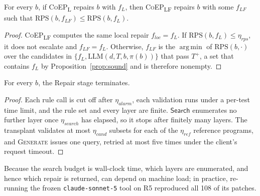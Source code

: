 \documentclass[acmsmall,screen,review,anonymous,nonacm]{acmart}
\DeclareMathOperator*{\argmin}{arg\,min}
\newcommand{\coepL}{\textsc{CoEP}\textsubscript{L}\xspace}
\newcommand{\coepLF}{\textsc{CoEP}\textsubscript{LF}\xspace}
\newcommand{\Fn}[1]{\textsc{#1}}
\newcommand{\aux}[1]{\ensuremath{\mathsf{#1}}}
\newcommand{\V}[1]{\ensuremath{\mathit{#1}}}
\newcommand{\RPS}{\mathrm{RPS}}
\newcommand{\cs}{\texttt{claude-sonnet-5}\xspace}
\begin{document}
\begin{proposition}\label{prop:gate}
For every $b$, if \coepL repairs $b$ with $f_L$, then \coepLF repairs $b$ with some $f_{LF}$ such that $\RPS(b, f_{LF}) \le \RPS(b, f_L)$.
\end{proposition}
\begin{proof}
\coepLF computes the same local repair $f_{\V{loc}} = f_L$. If $\RPS(b, f_L) \le \eta_{\V{rps}}$, it does not escalate and $f_{LF} = f_L$. Otherwise, $f_{LF}$ is the $\argmin$ of $\RPS(b, \cdot)$ over the candidates in $\{f_L, \mathrm{LLM}(d, T, b, \pi(b))\}$ that pass $T^{+}$, a set that contains $f_L$ by Proposition~\ref{prop:sound} and is therefore nonempty.
\end{proof}

\begin{proposition}[Termination]\label{prop:term}
For every $b$, the Repair stage terminates.
\end{proposition}
\begin{proof}
Each rule call is cut off after $\eta_{\V{alarm}}$, each validation runs under a per-test time limit, and the rule set and every layer are finite. \aux{Search} enumerates no further layer once $\eta_{\V{search}}$ has elapsed, so it stops after finitely many layers. The transplant validates at most $\eta_{\V{cand}}$ subsets for each of the $\eta_{\V{ref}}$ reference programs, and \Fn{Generate} issues one query, retried at most five times under the client's request timeout.
\end{proof}
Because the search budget is wall-clock time, which layers are enumerated, and hence which repair is returned, can depend on machine load; in practice, re-running the frozen \cs tool on R5 reproduced all 108 of its patches.
\end{document}
